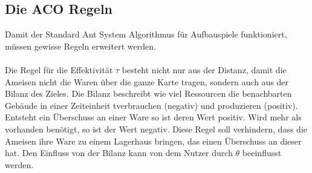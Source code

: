 \documentclass[12pt]{article}
\begin{document}
\subsection{Die ACO Regeln}\label{Regeln}
Damit der Standard Ant System Algorithmus für Aufbauspiele funktioniert, müssen gewisse Regeln erweitert werden. \\\\
Die Regel für die Effektivität $\tau$ besteht nicht nur aus der Distanz, damit die Ameisen nicht die Waren über die ganze Karte tragen, sondern auch aus der Bilanz des Zieles. Die Bilanz beschreibt wie viel Ressourcen die benachbarten Gebäude in einer Zeiteinheit t\footnotemark[3] verbrauchen (negativ) und produzieren (positiv). Entsteht ein Überschuss an einer Ware so ist deren Wert positiv. Wird mehr als vorhanden benötigt, so ist der Wert negativ. Diese Regel soll verhindern, dass die Ameisen ihre Ware zu einem Lagerhaus bringen, das einen Überschuss an dieser hat. Den Einfluss von der Bilanz kann von dem Nutzer durch $\theta$ beeinflusst werden.
\end{document}
